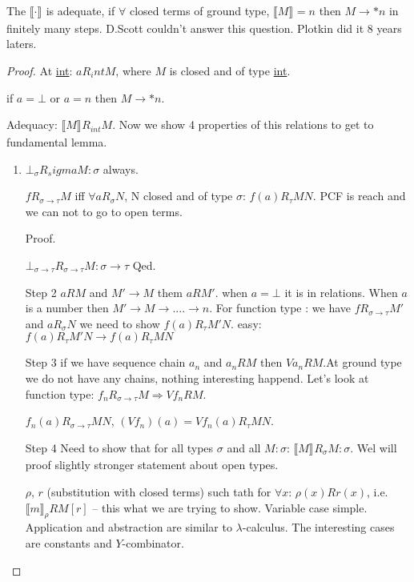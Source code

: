\documentclass[a4paper,10pt]{book}
\newcommand{\sem}[2]{ \llbracket#1\rrbracket_{#2} }
\newcommand{\rarr}{ \rightarrow }
\begin{document}
The $\sem{\cdot}{}$ is adequate, if $\forall$ closed terms of ground type, $\sem{M}{}=n$ then
$M \rarr* n$ in finitely many steps. D.Scott couldn't answer this question. Plotkin did it 8 years 
laters.

\begin{proof}
 At \underline{int}: $a R_int M$, where $M$ is closed and of type \underline{int}.
 
 if $a = \bot$ or $a=n$ then $M \rarr *n$.
 
 Adequacy: $\sem{M}{}R_{int}M$. Now we show 4 properties of this relations to get to fundamental lemma.
 
 \begin{enumerate}
  \item $\bot_\sigma R_sigma M:\sigma$ always.
  
  $f R_{\sigma\rarr \tau}M$ iff $\forall a R_\sigma N$, N closed and of type $\sigma$:
  $f(a)R_\tau MN$. PCF is   reach and we can not to go to open terms.
  
  Proof.
  
  $\bot_{\sigma\rarr \tau} R_{\sigma\rarr \tau}  M : \sigma \rarr \tau$
  Qed.
  \item [Step 2]
  $aRM$  and $M'\rarr M$ them $aRM'$. when $a=\bot$ it is in relations. When $a$ is a number
  then $M'\rarr M\rarr .... \rarr n$. For function type : we have $fR_{\sigma\rarr \tau}M'$ and
  $aR_\sigma N$ we need to show $f(a) R_\tau M'N$. easy: $f(a)R_\tau M'N \rarr f(a)R_\tau MN $
  \item[Step 3] 
  if we have sequence chain $a_n$ and $a_nRM$ then $Va_n RM$.At ground type we do not have any 
  chains, nothing interesting happend. Let's look at function type: 
  $f_nR_{\sigma\rarr \tau}M \Rightarrow Vf_nRM$.
  
  $f_n(a)R_{\sigma\rarr \tau}MN$,  $(Vf_n)(a) = Vf_n(a) R_\tau MN$.
  
  \item [Step 4]
  Need to show that for all types $\sigma$ and all $M:\sigma$: $\sem{M}{}R_\sigma M:\sigma$.
  Wel will proof slightly stronger statement about open types.
  
  $\rho$, $r$ (substitution with closed terms) such tath for $\forall x$: $\rho(x)Rr(x)$, i.e.
  $\sem{m}{\rho}R M[r]$ -- this what we are trying to show. Variable case simple. Application and
  abstraction are similar to $\lambda$-calculus. The interesting cases are constants and $Y$-combinator.
  

\end{enumerate}
\end{proof}
\end{document}
